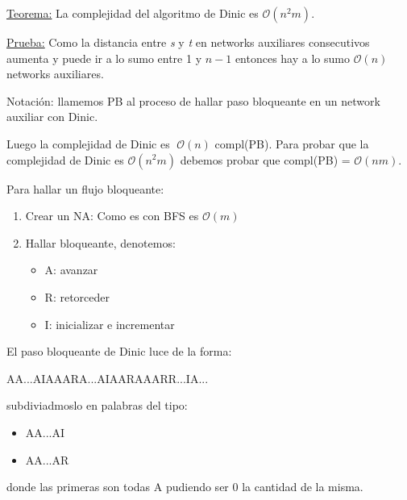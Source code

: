 \documentclass[12pt,a4paper]{report}
\begin{document}
		\underline{Teorema:} La complejidad del algoritmo de Dinic es $\mathcal{O}(n^{2}m)$.
		
		\underline{Prueba:} Como la distancia entre \textit{s} y \textit{t} en networks auxiliares consecutivos aumenta y puede ir a lo sumo entre 1 y $n-1$ entonces hay a lo sumo $\mathcal{O}(n)$ networks auxiliares.
		
		Notación: llamemos PB al proceso de hallar paso bloqueante en un network auxiliar con Dinic.

		Luego la complejidad de Dinic es $ \; \mathcal{O}(n)$ compl(PB). Para probar que la complejidad de Dinic es $\mathcal{O}(n^{2}m)$ debemos probar que compl(PB) = $\mathcal{O}(nm)$.

		Para hallar un flujo bloqueante:
		\begin{enumerate}
			\item Crear un NA: Como es con BFS es $\mathcal{O}(m)$
			\item Hallar bloqueante, denotemos:
				\begin{itemize}
					\item A: avanzar
					\item R: retorceder
					\item I: inicializar e incrementar
				\end{itemize}
		\end{enumerate}
		
		El paso bloqueante de Dinic luce de la forma:
		\begin{center}
			AA...AIAAARA...AIAARAAARR...IA...
		\end{center}
		
		subdiviadmoslo en palabras del tipo:
		\begin{center}
			\begin{itemize}
				\item AA...AI
				\item AA...AR
			\end{itemize}
		\end{center}
		
		donde las primeras son todas A pudiendo ser 0 la cantidad de la misma.
		
\end{document}
